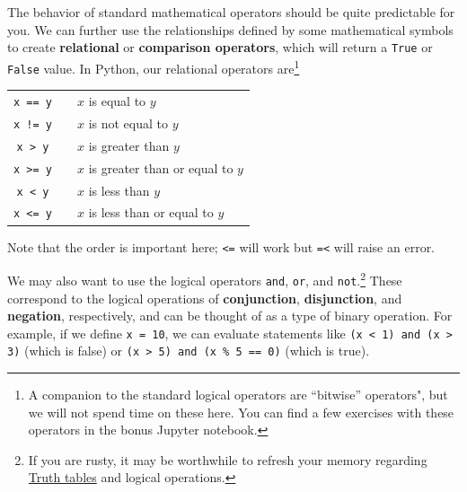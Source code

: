 \documentclass{tufte-book}
\begin{document}


The behavior of standard mathematical operators should be quite predictable for you. We can further use the relationships defined by some mathematical symbols to create \textbf{relational} or \textbf{comparison operators}, which will return a \verb|True| or \verb|False| value. In Python, our relational operators are\footnote{A companion to the standard logical operators are ``bitwise'' operators", but we will not spend time on these here. You can find a few exercises with these operators in the bonus Jupyter notebook.}

\begin{table}[h]
    \centering
    \begin{tabular}{ccl}
        \verb|x == y| & & $x$ is equal to $y$ \\
        \verb|x != y| & & $x$ is not equal to $y$ \\
        \verb|x > y|  & & $x$ is greater than $y$ \\
        \verb|x >= y| & & $x$ is greater than or equal to $y$ \\
        \verb|x < y| & & $x$ is less than $y$ \\
        \verb|x <= y| & & $x$ is less than or equal to $y$
    \end{tabular}
\end{table}

\noindent Note that the order is important here; \verb|<=| will work but \verb|=<| will raise an error. 

We may also want to use the logical operators \verb|and|, \verb|or|, and \verb|not|.\footnote{If you are rusty, it may be worthwhile to refresh your memory regarding \href{https://en.wikipedia.org/wiki/Truth_table}{Truth tables} and logical operations. %
} 
These correspond to the logical operations of \textbf{conjunction}, \textbf{disjunction}, and \textbf{negation}, respectively, and can be thought of as a type of binary operation. For example, if we define \verb|x = 10|, we can evaluate statements like \verb|(x < 1) and (x > 3)| (which is false) or \verb|(x > 5) and (x % 5 == 0)| (which is true). 
\end{document}
